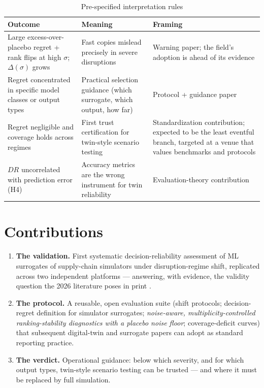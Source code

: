 \documentclass[12pt,a4paper]{article}
\begin{document}
\begin{table}[H]
\centering
\caption{Pre-specified interpretation rules}
\label{tab:tree}
\footnotesize
\begin{tabular}{p{6.0cm}p{4.2cm}p{3.9cm}}
\toprule
\textbf{Outcome} & \textbf{Meaning} & \textbf{Framing} \\
\midrule
Large excess-over-placebo regret + rank flips at high $\sigma$; $\Delta(\sigma)$ grows & Fast copies mislead precisely in severe disruptions & Warning paper; the field's adoption is ahead of its evidence \\
\midrule
Regret concentrated in specific model classes or output types & Practical selection guidance (which surrogate, which output, how far) & Protocol + guidance paper \\
\midrule
Regret negligible and coverage holds across regimes & First trust certification for twin-style scenario testing & Standardization contribution; expected to be the least eventful branch, targeted at a venue that values benchmarks and protocols \\
\midrule
 $DR$ uncorrelated with prediction error (H4) & Accuracy metrics are the wrong instrument for twin reliability & Evaluation-theory contribution \\
\bottomrule
\end{tabular}
\end{table}

\section{Contributions}

\begin{enumerate}
\item \textbf{The validation.} First systematic decision-reliability assessment of ML surrogates of supply-chain simulators under disruption-regime shift, replicated across two independent platforms --- answering, with evidence, the validity question the 2026 literature poses in print \citep{ivanov2026,liu2026,huang2026,soykan2026}.
\item \textbf{The protocol.} A reusable, open evaluation suite (shift protocols; decision-regret definition for simulator surrogates; \emph{noise-aware, multiplicity-controlled ranking-stability diagnostics with a placebo noise floor}; coverage-deficit curves) that subsequent digital-twin and surrogate papers can adopt as standard reporting practice.
\item \textbf{The verdict.} Operational guidance: below which severity, and for which output types, twin-style scenario testing can be trusted --- and where it must be replaced by full simulation.
\end{enumerate}
\end{document}

